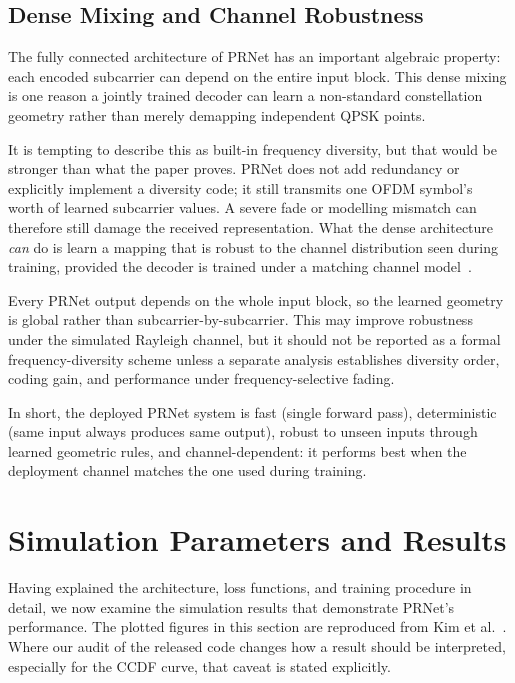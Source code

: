 \subsection{Dense Mixing and Channel Robustness}

The fully connected architecture of PRNet has an important algebraic property: each encoded subcarrier can depend on the entire input block.  This dense mixing is one reason a jointly trained decoder can learn a non-standard constellation geometry rather than merely demapping independent QPSK points.

It is tempting to describe this as built-in frequency diversity, but that would be stronger than what the paper proves.  PRNet does not add redundancy or explicitly implement a diversity code; it still transmits one OFDM symbol's worth of learned subcarrier values.  A severe fade or modelling mismatch can therefore still damage the received representation.  What the dense architecture \emph{can} do is learn a mapping that is robust to the channel distribution seen during training, provided the decoder is trained under a matching channel model~\cite{kim2017novel}.

\begin{keyinsight}
    Every PRNet output depends on the whole input block, so the learned geometry is global rather than subcarrier-by-subcarrier.  This may improve robustness under the simulated Rayleigh channel, but it should not be reported as a formal frequency-diversity scheme unless a separate analysis establishes diversity order, coding gain, and performance under frequency-selective fading.
\end{keyinsight}

In short, the deployed PRNet system is fast (single forward pass), deterministic (same input always produces same output), robust to unseen inputs through learned geometric rules, and channel-dependent: it performs best when the deployment channel matches the one used during training.


\section{Simulation Parameters and Results}

Having explained the architecture, loss functions, and training procedure in detail, we now examine the simulation results that demonstrate PRNet's performance.  The plotted figures in this section are reproduced from Kim et al.~\cite{kim2017novel}.  Where our audit of the released code changes how a result should be interpreted, especially for the CCDF curve, that caveat is stated explicitly.


